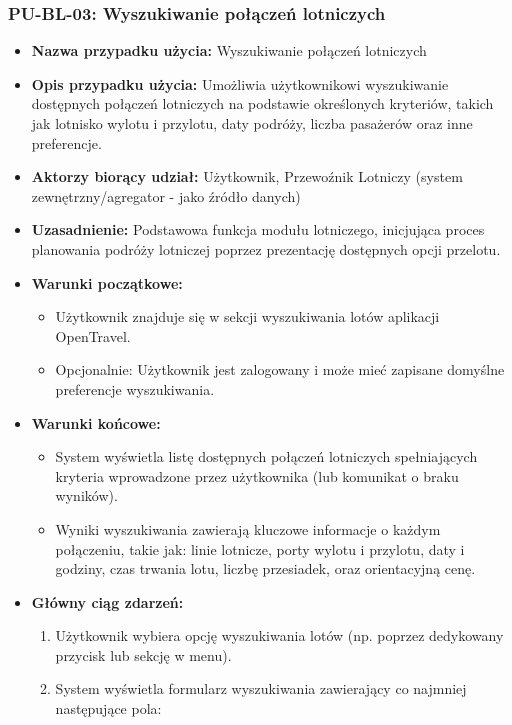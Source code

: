 \documentclass[a4paper,12pt]{article}
\begin{document}
\subsubsection{PU-BL-03: Wyszukiwanie połączeń lotniczych}
\begin{itemize}
    \item \textbf{Nazwa przypadku użycia:} Wyszukiwanie połączeń lotniczych
    \item \textbf{Opis przypadku użycia:} Umożliwia użytkownikowi wyszukiwanie dostępnych połączeń lotniczych na podstawie określonych kryteriów, takich jak lotnisko wylotu i przylotu, daty podróży, liczba pasażerów oraz inne preferencje.
    \item \textbf{Aktorzy biorący udział:} Użytkownik, Przewoźnik Lotniczy (system zewnętrzny/agregator - jako źródło danych)
    \item \textbf{Uzasadnienie:} Podstawowa funkcja modułu lotniczego, inicjująca proces planowania podróży lotniczej poprzez prezentację dostępnych opcji przelotu.
    \item \textbf{Warunki początkowe:}
        \begin{itemize}
            \item Użytkownik znajduje się w sekcji wyszukiwania lotów aplikacji OpenTravel.
            \item Opcjonalnie: Użytkownik jest zalogowany i może mieć zapisane domyślne preferencje wyszukiwania.
        \end{itemize}
    \item \textbf{Warunki końcowe:}
        \begin{itemize}
            \item System wyświetla listę dostępnych połączeń lotniczych spełniających kryteria wprowadzone przez użytkownika (lub komunikat o braku wyników).
            \item Wyniki wyszukiwania zawierają kluczowe informacje o każdym połączeniu, takie jak: linie lotnicze, porty wylotu i przylotu, daty i godziny, czas trwania lotu, liczbę przesiadek, oraz orientacyjną cenę.
        \end{itemize}
    \item \textbf{Główny ciąg zdarzeń:}
        \begin{enumerate}
            \item Użytkownik wybiera opcję wyszukiwania lotów (np. poprzez dedykowany przycisk lub sekcję w menu).
            \item System wyświetla formularz wyszukiwania zawierający co najmniej następujące pola:

\end{enumerate}
\end{itemize}
\end{document}
